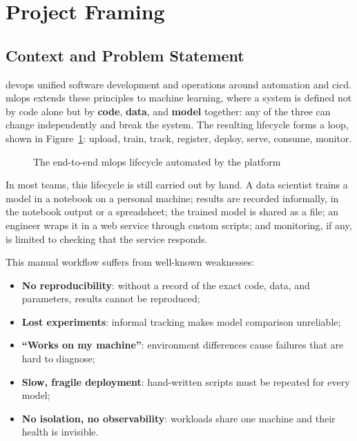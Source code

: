 \section{Project Framing}
\label{sec:framing}

\subsection{Context and Problem Statement}
\label{sec:critique}
\gls{devops} unified software development and operations around automation and
\gls{cicd}. \gls{mlops} extends these principles to machine learning, where a
system is defined not by code alone but by \textbf{code}, \textbf{data}, and
\textbf{model} together: any of the three can change independently and break
the system. The resulting lifecycle forms a loop, shown in
Figure~\ref{fig:mlops-lifecycle}: upload, train, track, register, deploy,
serve, consume, monitor.

\begin{figure}[H]\centering
{}
\caption{The end-to-end \gls{mlops} lifecycle automated by the platform}
\label{fig:mlops-lifecycle}
\end{figure}

In most teams, this lifecycle is still carried out by hand. A data scientist
trains a model in a notebook on a personal machine; results are recorded
informally, in the notebook output or a spreadsheet; the trained model is
shared as a file; an engineer wraps it in a web service through custom scripts;
and monitoring, if any, is limited to checking that the service responds.

This manual workflow suffers from well-known weaknesses:
\begin{itemize}[leftmargin=1.4em]
  \item \textbf{No reproducibility}: without a record of the exact code, data,
        and parameters, results cannot be reproduced;
  \item \textbf{Lost experiments}: informal tracking makes model comparison
        unreliable;
  \item \textbf{``Works on my machine''}: environment differences cause
        failures that are hard to diagnose;
  \item \textbf{Slow, fragile deployment}: hand-written scripts must be
        repeated for every model;
  \item \textbf{No isolation, no observability}: workloads share one machine
        and their health is invisible.
\end{itemize}


